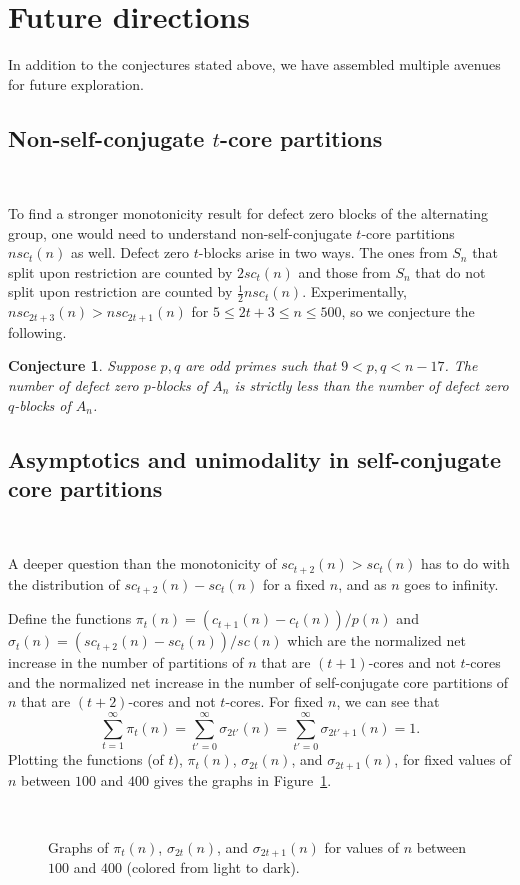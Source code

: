 \documentclass[12pt,leqno]{amsart}
\newtheorem{conj}[lem]{Conjecture}
\numberwithin{equation}{section}
\theoremstyle{definition}
\begin{document}
\section{Future directions}
\label{sec:other}

In addition to the conjectures stated above, we have assembled multiple avenues for future exploration.

\subsection{Non-self-conjugate $t$-core partitions}\

To find a stronger monotonicity result for defect zero blocks of the alternating group, one would need to understand non-self-conjugate $t$-core partitions $nsc_t(n)$ as well.  Defect zero $t$-blocks arise in two ways.  The ones from $S_n$ that split upon restriction are counted by $2sc_t(n)$ and those from $S_n$ that do not split upon restriction are counted by $\frac{1}{2}nsc_t(n)$.  Experimentally, $nsc_{2t+3}(n)>nsc_{2t+1}(n)$ for $5\leq 2t+3\leq n\leq 500$, so we conjecture the following.

\begin{conj} Suppose $p,q$ are odd primes such that $9<p,q< n-17$. The number of defect zero $p$-blocks of $A_n$ is strictly less than the number of defect zero $q$-blocks of $A_n$.
\end{conj}

\subsection{Asymptotics and unimodality in self-conjugate core partitions}\

A deeper question than the monotonicity of $sc_{t+2}(n)>sc_{t}(n)$ has to do with the distribution of $sc_{t+2}(n)-sc_t(n)$ for a fixed $n$, and as $n$ goes to infinity.  

Define the functions $\pi_t(n)=(c_{t+1}(n)-c_{t}(n))/p(n)$ and $\sigma_t(n)=(sc_{t+2}(n)-sc_{t}(n))/sc(n)$ which are the normalized net increase in the number of partitions of $n$ that are $(t+1)$-cores and not $t$-cores and the normalized net increase in the number of self-conjugate core partitions of $n$ that are $(t+2)$-cores and not $t$-cores.  For fixed $n$, we can see that 
\[\sum_{t=1}^\infty \pi_t(n)=\sum_{t'=0}^{\infty} \sigma_{2t'}(n)=\sum_{t'=0}^{\infty} \sigma_{2t'+1}(n)=1.\] 
Plotting the functions (of $t$), $\pi_t(n)$, $\sigma_{2t}(n)$, and $\sigma_{2t+1}(n)$, for fixed values of $n$ between $100$ and $400$ gives the graphs in Figure~\ref{fig:distr}.    
\begin{figure}\hspace{-.3in}~~\!\!\!\!\!\!\!\!\caption{Graphs of $\pi_t(n)$, $\sigma_{2t}(n)$, and $\sigma_{2t+1}(n)$ for values of $n$ between $100$ and $400$ (colored from light to dark).}
\label{fig:distr}
\end{figure}
\end{document}
